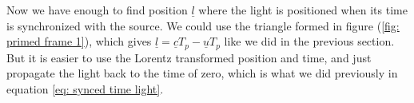 \begin{derivation}

	Now we have enough to find position $\underline{l}$ where the light is positioned when its time is synchronized with the source.
	We could use the triangle formed in figure (\ref{fig: primed frame 1}), which gives $\underline{l} = \underline{c} T_{p} -\underline{u} T_{p}$ like we did in the previous section.
	But it is easier to use the Lorentz transformed position and time, and just propagate the light back to the time of zero, which is what we did previously in equation \eqref{eq: synced time light}.


\end{derivation}
